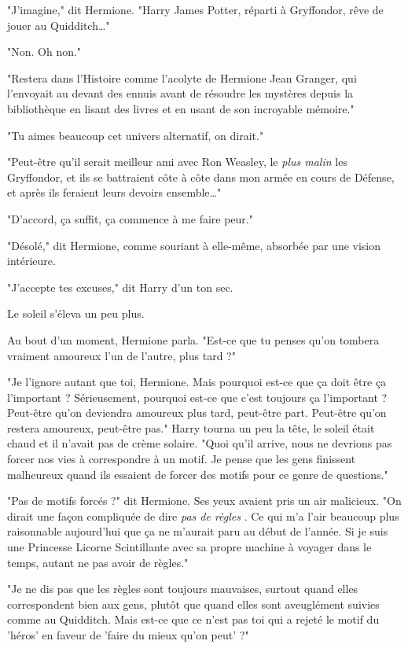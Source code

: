 "J'imagine," dit Hermione. "Harry James Potter, réparti à Gryffondor, rêve de jouer au Quidditch…"

"Non. Oh non."

"Restera dans l'Histoire comme l'acolyte de Hermione Jean Granger, qui l'envoyait au devant des ennuis avant de résoudre les mystères depuis la bibliothèque en lisant des livres et en usant de son incroyable mémoire."

"Tu aimes beaucoup cet univers alternatif, on dirait."

"Peut-être qu'il serait meilleur ami avec Ron Weasley, le \emph{plus malin}  les Gryffondor, et ils se battraient côte à côte dans mon armée en cours de Défense, et après ils feraient leurs devoirs ensemble…"

"D'accord, ça suffit, ça commence à me faire peur."

"Désolé," dit Hermione, comme souriant à elle-même, absorbée par une vision intérieure.

"J'accepte tes excuses," dit Harry d'un ton sec.

Le soleil s'éleva un peu plus.

Au bout d'un moment, Hermione parla. "Est-ce que tu penses qu'on tombera vraiment amoureux l'un de l'autre, plus tard ?"

"Je l'ignore autant que toi, Hermione. Mais pourquoi est-ce que ça doit être ça l'important ? Sérieusement, pourquoi est-ce que c'est toujours ça l'important ? Peut-être qu'on deviendra amoureux plus tard, peut-être part. Peut-être qu'on restera amoureux, peut-être pas." Harry tourna un peu la tête, le soleil était chaud et il n'avait pas de crème solaire. "Quoi qu'il arrive, nous ne devrions pas forcer nos vies à correspondre à un motif. Je pense que les gens finissent malheureux quand ils essaient de forcer des motifs pour ce genre de questions."

"Pas de motifs forcés ?" dit Hermione. Ses yeux avaient pris un air malicieux. "On dirait une façon compliquée de dire \emph{pas de règles} . Ce qui m'a l'air beaucoup plus raisonnable aujourd'hui que ça ne m'aurait paru au début de l'année. Si je suis une Princesse Licorne Scintillante avec sa propre machine à voyager dans le temps, autant ne pas avoir de règles."

"Je ne dis pas que les règles sont toujours mauvaises, surtout quand elles correspondent bien aux gens, plutôt que quand elles sont aveuglément suivies comme au Quidditch. Mais est-ce que ce n'est pas toi qui a rejeté le motif du 'héros' en faveur de 'faire du mieux qu'on peut' ?"

